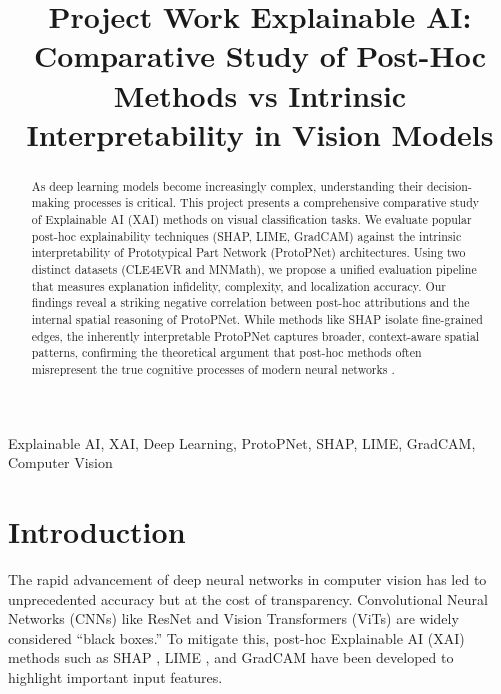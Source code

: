 \documentclass[conference]{IEEEtran}
\begin{document}
\title{Project Work Explainable AI:\\
Comparative Study of Post-Hoc Methods vs Intrinsic Interpretability in Vision Models\\
}

\author{
}

\maketitle

\begin{abstract}
As deep learning models become increasingly complex, understanding their decision-making processes is critical. This project presents a comprehensive comparative study of Explainable AI (XAI) methods on visual classification tasks. We evaluate popular post-hoc explainability techniques (SHAP, LIME, GradCAM) against the intrinsic interpretability of Prototypical Part Network (ProtoPNet) architectures. Using two distinct datasets (CLE4EVR and MNMath), we propose a unified evaluation pipeline that measures explanation infidelity, complexity, and localization accuracy. Our findings reveal a striking negative correlation between post-hoc attributions and the internal spatial reasoning of ProtoPNet. While methods like SHAP isolate fine-grained edges, the inherently interpretable ProtoPNet captures broader, context-aware spatial patterns, confirming the theoretical argument that post-hoc methods often misrepresent the true cognitive processes of modern neural networks \cite{rudin2019stop}.
\end{abstract}

\begin{IEEEkeywords}
Explainable AI, XAI, Deep Learning, ProtoPNet, SHAP, LIME, GradCAM, Computer Vision
\end{IEEEkeywords}

\section{Introduction}
The rapid advancement of deep neural networks in computer vision has led to unprecedented accuracy but at the cost of transparency. Convolutional Neural Networks (CNNs) like ResNet \cite{he2016deep} and Vision Transformers (ViTs) \cite{dosovitskiy2020image} are widely considered ``black boxes.'' To mitigate this, post-hoc Explainable AI (XAI) methods such as SHAP \cite{lundberg2017unified}, LIME \cite{ribeiro2016should}, and GradCAM \cite{selvaraju2017grad} have been developed to highlight important input features. 
\end{document}
